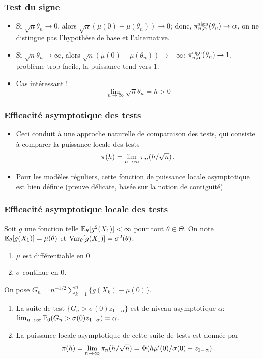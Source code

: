 \begin{frame}
\frametitle{Test du signe}
\begin{itemize}
\item Si $\sqrt{n} \theta_n \to 0$, alors $\sqrt{n}(\mu(0)- \mu(\theta_n)) \to
  0$; donc, $\pi_{n,\alpha}^{\mathrm{sign}}(\theta_n) \to \alpha$, on ne
  distingue pas l'hypothèse de base et l'alternative.
\item Si $\sqrt{n} \theta_n \to \infty$, alors $\sqrt{n}(\mu(0)- \mu(\theta_n)) \to -\infty$: $\pi_{n,\alpha}^{\mathrm{sign}}(\theta_n) \to 1$, problème \alert{trop facile}, la puissance tend vers $1$.
\item Cas intéressant !
\alert{
\[
\lim_{n \to \infty} \sqrt{n} \theta_n= h > 0
\]
}
\end{itemize}
\end{frame}

\begin{frame}
\frametitle{Efficacité asymptotique des tests}
\begin{itemize}
\item Ceci conduit à une approche naturelle de comparaison des tests, qui
  consiste à comparer la \alert{puissance locale des tests} \alert{
\[
\pi(h)= \lim_{n \to \infty} \pi_n( h / \sqrt{n}) \,.
\]
}
\item Pour les modèles réguliers, cette fonction de \alert{puissance locale asymptotique} est bien définie (preuve délicate, basée sur la notion de \alert{contiguité})
\end{itemize}
\end{frame}

\begin{frame}
\frametitle{Efficacité asymptotique locale des tests}
\begin{theo}
Soit $g$ une fonction telle $\operatorname{{\mathbb E}}_\theta[g^2(X_1)] < \infty$ pour tout $\theta \in \Theta$. On note $\operatorname{{\mathbb E}}_\theta[g(X_1)]= \mu(\theta)$
et $\operatorname{\mathrm{Var}}_\theta[g(X_1)]= \sigma^2(\theta)$.
\begin{enumerate}
\item $\mu$ est différentiable en $0$
\item $\sigma$ continue en $0$.
\end{enumerate}
On pose $G_n= n^{-1/2} \sum_{k=1}^n \{ g(X_k) - \mu(0) \}$.
\begin{enumerate}
\item La suite de test $\{ G_n > \sigma(0) z_{1-\alpha}\}$  est de niveau asymptotique $\alpha$: $\lim_{n \to \infty} \operatorname{{\mathbb P}}_{0}( G_n > \sigma(0) z_{1-\alpha})= \alpha$.
\item La \alert{puissance locale asymptotique} de cette suite de tests est donnée par
\[
\pi(h)= \lim_{n \to \infty} \pi_n( h/\sqrt{n})= \Phi(h \mu'(0)/\sigma(0) - z_{1-\alpha}) \,.
\]
\end{enumerate}
\end{theo}
\end{frame}

